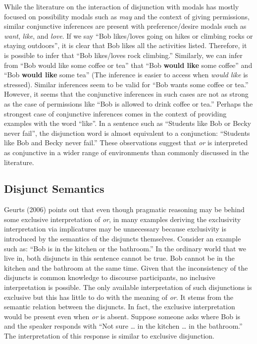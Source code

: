 \documentclass[oneside]{report}
\theoremstyle{definition}
\theoremstyle{definition}
\theoremstyle{definition}
\theoremstyle{remark}
\begin{document}
While the literature on the interaction of disjunction with modals has
mostly focused on possibility modals such as \emph{may} and the context
of giving permissions, similar conjunctive inferences are present with
preference/desire modals such as \emph{want}, \emph{like}, and
\emph{love}. If we say ``Bob likes/loves going on hikes or climbing
rocks or staying outdoors'', it is clear that Bob likes all the
activities listed. Therefore, it is possible to infer that ``Bob
likes/loves rock climbing.'' Similarly, we can infer from ``Bob would
like some coffee or tea'' that ``Bob \textbf{would like} some coffee''
and ``Bob \textbf{would like} some tea'' (The inference is easier to
access when \emph{would like} is stressed). Similar inferences seem to
be valid for ``Bob wants some coffee or tea.'' However, it seems that
the conjunctive inferences in such cases are not as strong as the case
of permissions like ``Bob is allowed to drink coffee or tea.'' Perhaps
the strongest case of conjunctive inferences comes in the context of
providing examples with the word ``like''. In a sentence such as
``Students like Bob or Becky never fail'', the disjunction word is
almost equivalent to a conjunction: ``Students like Bob and Becky never
fail.'' These observations suggest that \emph{or} is interpreted as
conjunctive in a wider range of environments than commonly discussed in
the literature.

\subsection{Disjunct Semantics}\label{disjunct-semantics}

Geurts (2006) points out that even though pragmatic reasoning may be
behind some exclusive interpretation of \emph{or}, in many examples
deriving the exclusivity interpretation via implicatures may be
unnecessary because exclusivity is introduced by the semantics of the
disjuncts themselves. Consider an example such as: ``Bob is in the
kitchen or the bathroom.'' In the ordinary world that we live in, both
disjuncts in this sentence cannot be true. Bob cannot be in the kitchen
and the bathroom at the same time. Given that the inconsistency of the
disjuncts is common knowledge to discourse participants, no inclusive
interpretation is possible. The only available interpretation of such
disjunctions is exclusive but this has little to do with the meaning of
\emph{or}. It stems from the semantic relation between the disjuncts. In
fact, the exclusive interpretation would be present even when \emph{or}
is absent. Suppose someone asks where Bob is and the speaker responds
with ``Not sure \ldots{} in the kitchen \ldots{} in the bathroom.'' The
interpretation of this response is similar to exclusive disjunction.
\end{document}
